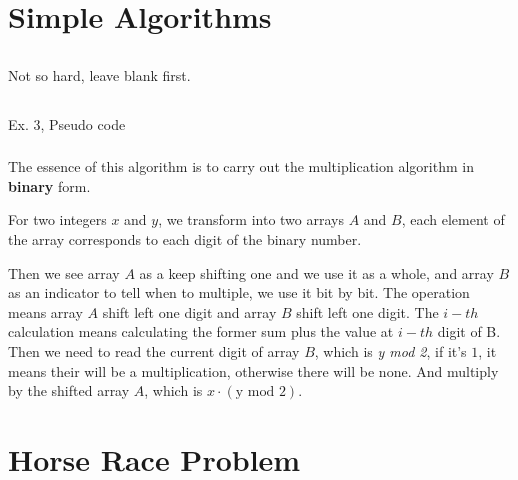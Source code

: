 \documentclass[A4paper]{article}
\begin{document}
\section{Simple Algorithms}
\subsection{}
Not so hard, leave blank first.
\subsection{}
\subsubsection{}
\begin{algorithm}[H]
\BlankLine
{}
\caption{Ex. 3, Pseudo code}
\end{algorithm}
\subsubsection{}
The essence of this algorithm is to carry out the multiplication algorithm in \textbf{binary} form.
\par For two integers $x$ and $y$, we transform into two arrays $A$ and $B$, each element of the array corresponds to each digit of the binary number.
\par Then we see array $A$ as a keep shifting one and we use it as a whole, and array $B$ as an indicator to tell when to multiple, we use it bit by bit. The  operation means array $A$ shift left one digit and array $B$ shift left one digit. The $i-th$ calculation means calculating the former sum plus the value at $i-th$ digit of B. Then we need to read the current digit of array $B$, which is \textit{y mod 2}, if it's $1$, it means their will be a multiplication, otherwise there will be none. And multiply by the shifted array $A$, which is $x \cdot (\text{y mod 2})$.

\section{Horse Race Problem}
\end{document}
